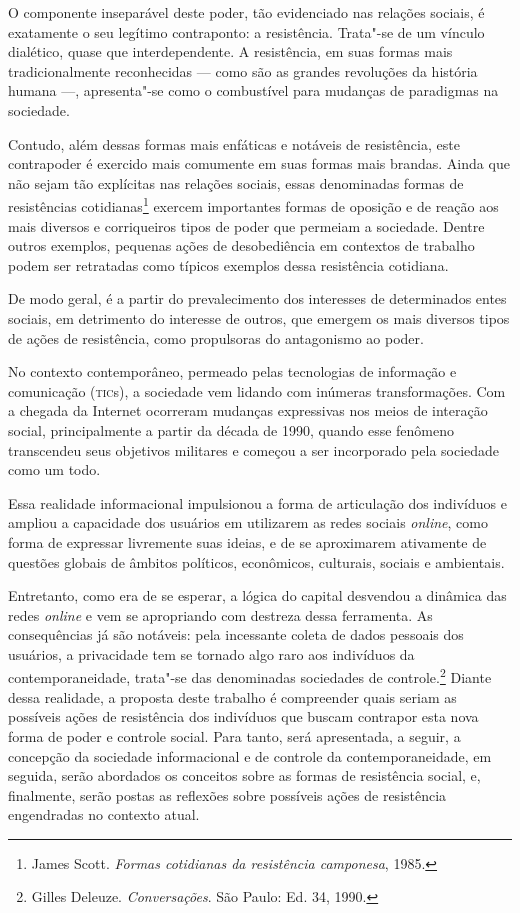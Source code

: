 O componente inseparável deste poder, tão evidenciado nas relações
sociais, é exatamente o seu legítimo contraponto: a resistência.
Trata"-se de um vínculo dialético, quase que interdependente. A
resistência, em suas formas mais tradicionalmente reconhecidas --- como
são as grandes revoluções da história humana ---, apresenta"-se como o
combustível para mudanças de paradigmas na sociedade.

Contudo, além dessas formas mais enfáticas e notáveis de resistência,
este contrapoder é exercido mais comumente em suas formas mais brandas.
Ainda que não sejam tão explícitas nas relações sociais, essas
denominadas formas de resistências cotidianas\footnote{James Scott. \emph{Formas cotidianas da resistência camponesa}, 1985.} exercem
importantes formas de oposição e de reação aos mais diversos e
corriqueiros tipos de poder que permeiam a sociedade. Dentre outros
exemplos, pequenas ações de desobediência em contextos de trabalho podem
ser retratadas como típicos exemplos dessa resistência cotidiana.

De modo geral, é a partir do prevalecimento dos interesses de
determinados entes sociais, em detrimento do interesse de outros, que
emergem os mais diversos tipos de ações de resistência, como propulsoras
do antagonismo ao poder.

No contexto contemporâneo, permeado pelas tecnologias de informação e
comunicação (\textsc{tic}s), a sociedade vem lidando com inúmeras transformações.
Com a chegada da Internet ocorreram mudanças expressivas nos meios de
interação social, principalmente a partir da década de 1990, quando esse
fenômeno transcendeu seus objetivos militares e começou a ser
incorporado pela sociedade como um todo.

Essa realidade informacional impulsionou a forma de articulação dos
indivíduos e ampliou a capacidade dos usuários em utilizarem as redes
sociais \emph{online}, como forma de expressar livremente suas ideias, e de se
aproximarem ativamente de questões globais de âmbitos políticos,
econômicos, culturais, sociais e ambientais.

Entretanto, como era de se esperar, a lógica do capital desvendou a
dinâmica das redes \emph{online} e vem se apropriando com destreza dessa
ferramenta. As consequências já são notáveis: pela incessante coleta de
dados pessoais dos usuários, a privacidade tem se tornado algo raro aos
indivíduos da contemporaneidade, trata"-se das denominadas sociedades de
controle.\footnote{Gilles Deleuze. \emph{Conversações}. São Paulo: Ed. 34, 1990.} Diante dessa realidade, a proposta deste
trabalho é compreender quais seriam as possíveis ações de resistência
dos indivíduos que buscam contrapor esta nova forma de poder e controle
social. Para tanto, será apresentada, a seguir, a concepção da sociedade
informacional e de controle da contemporaneidade, em seguida, serão
abordados os conceitos sobre as formas de resistência social, e,
finalmente, serão postas as reflexões sobre possíveis ações de
resistência engendradas no contexto atual.

